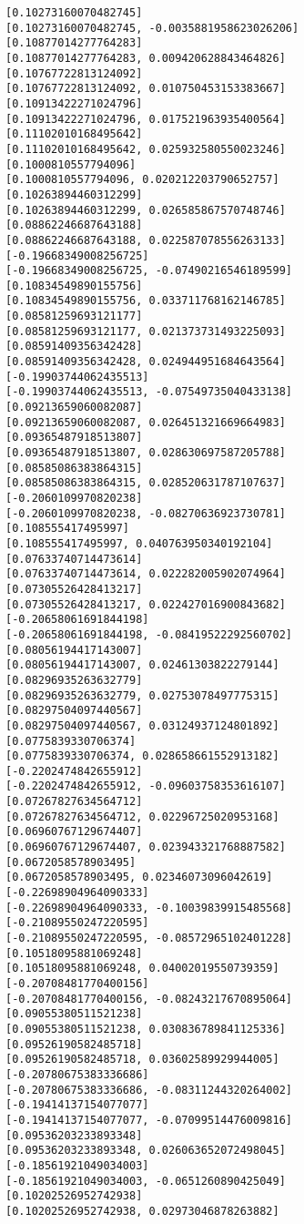 \documentclass[11pt]{article}
\begin{document}
\begin{Verbatim}[commandchars=\\\{\}]
[0.10273160070482745]
[0.10273160070482745, -0.0035881958623026206]
[0.10877014277764283]
[0.10877014277764283, 0.009420628843464826]
[0.10767722813124092]
[0.10767722813124092, 0.010750453153383667]
[0.10913422271024796]
[0.10913422271024796, 0.017521963935400564]
[0.11102010168495642]
[0.11102010168495642, 0.025932580550023246]
[0.1000810557794096]
[0.1000810557794096, 0.020212203790652757]
[0.10263894460312299]
[0.10263894460312299, 0.026585867570748746]
[0.08862246687643188]
[0.08862246687643188, 0.022587078556263133]
[-0.19668349008256725]
[-0.19668349008256725, -0.07490216546189599]
[0.10834549890155756]
[0.10834549890155756, 0.033711768162146785]
[0.08581259693121177]
[0.08581259693121177, 0.021373731493225093]
[0.08591409356342428]
[0.08591409356342428, 0.024944951684643564]
[-0.19903744062435513]
[-0.19903744062435513, -0.07549735040433138]
[0.09213659060082087]
[0.09213659060082087, 0.026451321669664983]
[0.09365487918513807]
[0.09365487918513807, 0.028630697587205788]
[0.08585086383864315]
[0.08585086383864315, 0.028520631787107637]
[-0.2060109970820238]
[-0.2060109970820238, -0.08270636923730781]
[0.108555417495997]
[0.108555417495997, 0.040763950340192104]
[0.07633740714473614]
[0.07633740714473614, 0.022282005902074964]
[0.07305526428413217]
[0.07305526428413217, 0.022427016900843682]
[-0.20658061691844198]
[-0.20658061691844198, -0.08419522292560702]
[0.08056194417143007]
[0.08056194417143007, 0.02461303822279144]
[0.08296935263632779]
[0.08296935263632779, 0.02753078497775315]
[0.08297504097440567]
[0.08297504097440567, 0.03124937124801892]
[0.0775839330706374]
[0.0775839330706374, 0.028658661552913182]
[-0.2202474842655912]
[-0.2202474842655912, -0.09603758353616107]
[0.07267827634564712]
[0.07267827634564712, 0.02296725020953168]
[0.06960767129674407]
[0.06960767129674407, 0.023943321768887582]
[0.0672058578903495]
[0.0672058578903495, 0.02346073096042619]
[-0.22698904964090333]
[-0.22698904964090333, -0.10039839915485568]
[-0.21089550247220595]
[-0.21089550247220595, -0.08572965102401228]
[0.10518095881069248]
[0.10518095881069248, 0.04002019550739359]
[-0.20708481770400156]
[-0.20708481770400156, -0.08243217670895064]
[0.09055380511521238]
[0.09055380511521238, 0.030836789841125336]
[0.09526190582485718]
[0.09526190582485718, 0.03602589929944005]
[-0.20780675383336686]
[-0.20780675383336686, -0.08311244320264002]
[-0.19414137154077077]
[-0.19414137154077077, -0.07099514476009816]
[0.09536203233893348]
[0.09536203233893348, 0.026063652072498045]
[-0.18561921049034003]
[-0.18561921049034003, -0.0651260890425049]
[0.10202526952742938]
[0.10202526952742938, 0.02973046878263882]

\end{Verbatim}
\end{document}
